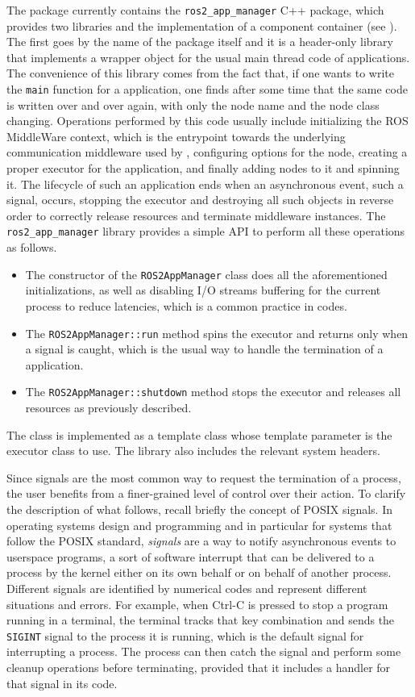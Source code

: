 The package currently contains the \texttt{ros2\_app\_manager} C++ package, which provides two libraries and the implementation of a component container (see ). The first goes by the name of the package itself and it is a header-only library that implements a wrapper object for the usual main thread code of \ROS applications. The convenience of this library comes from the fact that, if one wants to write the \texttt{main} function for a \ROS application, one finds after some time that the same code is written over and over again, with only the node name and the node class changing. Operations performed by this code usually include initializing the ROS MiddleWare context, which is the entrypoint towards the underlying communication middleware used by \ROS, configuring options for the \ROS node, creating a proper executor for the application, and finally adding nodes to it and spinning it. The lifecycle of such an application ends when an asynchronous event, such a signal, occurs, stopping the executor and destroying all such objects in reverse order to correctly release resources and terminate middleware instances. The \texttt{ros2\_app\_manager} library provides a simple API to perform all these operations as follows.
\begin{itemize}
  \item The constructor of the \texttt{ROS2AppManager} class does all the aforementioned initializations, as well as disabling I/O streams buffering for the current process to reduce latencies, which is a common practice in \ROS codes.
  \item The \texttt{ROS2AppManager::run} method spins the executor and returns only when a signal is caught, which is the usual way to handle the termination of a \ROS application.
  \item The \texttt{ROS2AppManager::shutdown} method stops the executor and releases all resources as previously described.
\end{itemize}
The class is implemented as a template class whose template parameter is the \ROS executor class to use. The library also includes the relevant system headers.

Since signals are the most common way to request the termination of a \ROS process, the user benefits from a finer-grained level of control over their action. To clarify the description of what follows, recall briefly the concept of POSIX signals. In operating systems design and programming and in particular for systems that follow the POSIX standard, \emph{signals} are a way to notify asynchronous events to userspace programs, a sort of software interrupt that can be delivered to a process by the kernel either on its own behalf or on behalf of another process. Different signals are identified by numerical codes and represent different situations and errors. For example, when Ctrl-C is pressed to stop a program running in a terminal, the terminal tracks that key combination and sends the \texttt{SIGINT} signal to the process it is running, which is the default signal for interrupting a process. The process can then catch the signal and perform some cleanup operations before terminating, provided that it includes a handler for that signal in its code.

